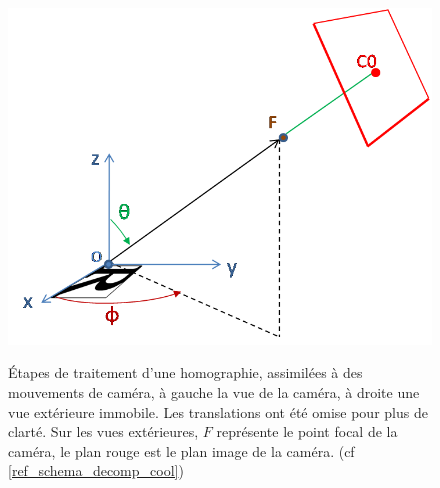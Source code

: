 \begin{figure}
{		{\includegraphics[scale=0.5]{vue_tps_hom_part.png}}}\\
		\caption{Étapes de traitement d'une homographie, assimilées à des mouvements de caméra, à gauche la vue de la caméra, à droite une vue extérieure immobile. Les translations ont été omise pour plus de clarté. Sur les vues extérieures, $F$ représente le point focal de la caméra, le plan rouge est le plan image de la caméra. (cf \ref{ref_schema_decomp_cool})}
		\label{schema_decomp_cool}
		\label{SchemaEtapesDecompoGeometrique}
	\end{figure}
